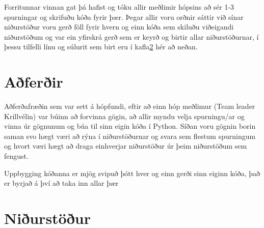 \documentclass[12pt, svn, draft]{rureport}
\begin{document}
Forritunnar vinnan gat þá hafist og tóku allir meðlimir hópsins að sér 1-3 spurningar og skrifuðu kóða fyrir þær. Þegar allir voru orðnir sáttir við sínar niðurstöður voru gerð föll fyrir hvern og einn kóða sem skiluðu viðeigandi niðurstöðum og var ein yfirskrá gerð sem er keyrð og birtir allar niðurstöðurnar, í þessu tilfelli línu og súlurit sem birt eru í kafla\ref{nidurstodur} hér að neðan.

\section{Aðferðir}

Aðferðafræðin sem var sett á hópfundi, eftir að einn hóp meðlimur (Team leader Krillvélin) var búinn að forvinna gögin, að allir myndu velja spurningu/ar og vinna úr gögnunum og búa til sinn eigin kóða í Python. Síðan voru gögnin borin saman svo hægt væri að rýna í niðurstöðurnar og svara sem flestum spurningum og hvort væri hægt að draga einhverjar niðurstöður úr þeim niðurstöðum sem fengust.

Uppbygging kóðanna er mjög svipuð þótt hver og einn gerði sinn eiginn kóða, það er byrjað á því að taka inn allar þær 
 



\section{Niðurstöður}\label{nidurstodur}




\printbibliography
\end{document}
